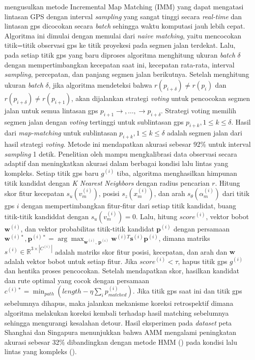 \cite{Huang2022} mengusulkan metode Incremental Map Matching (IMM) yang dapat mengatasi lintasan GPS dengan interval \textit{sampling} yang sangat tinggi secara \textit{real-time} dan lintasan gps dicocokan secara \textit{batch} sehingga waktu komputasi jauh lebih cepat. Algoritma ini dimulai dengan memulai dari \textit{naive matching}, yaitu mencocokan titik=titik observasi gps ke titik proyekesi pada segmen jalan terdekat. Lalu, pada setiap titik gps yang baru diproses algoritma menghitung ukuran \textit{batch} $\delta$ dengan mempertimbangkan kecepatan saat ini, kecepatan rata-rata, interval \textit{sampling}, percepatan, dan panjang segmen jalan berikutnya. Setelah menghitung ukuran \textit{batch} $\delta$, jika algoritma mendeteksi bahwa $r(p_{i+\delta}) \neq r(p_i)$ dan $r(p_{i+\delta}) \neq r(p_{i+1})$, akan dijalankan strategi \textit{voting} untuk pencocokan segmen jalan untuk semua lintasan gps $p_{i+1}\rightarrow,\ldots,\rightarrow p_{i+\delta}$. Strategi voting memilih segmen jalan dengan \textit{voting} tertinggi untuk sublintasan gps $p_{i+k}, 1\leq k \leq \delta$. Hasil dari \textit{map-matching} untuk sublintasan $p_{i+k}, 1\leq k \leq \delta$ adalah segmen jalan dari hasil strategi \textit{voting}. Metode ini mendapatkan akurasi sebesar 92\% untuk interval \textit{sampling} 1 detik. Penelitian oleh \cite{Hu2023} mampu mengkalibrasi data observasi secara adaptif dan meningkatkan akurasi dalam berbagai kondisi lalu lintas yang kompleks. Setiap titik gps baru $g^{(i)}$ tiba, algoritma menghasilkan himpunan titik kandidat dengan \textit{K Nearest Neighbors} dengan radius pencarian $r$. Hitung skor fitur kecepatan $s_u(v_m^{(i)})$, posisi $s_z(x_m^{(i)})$, dan arah $s_\theta(\alpha_m^{(i)})$ dari titik gps $i$ dengan mempertimbangkan fitur-fitur dari setiap titik kandidat, buang titik-titik kandiddat dengan $s_u(v_m^{(i)})=0$. Lalu, hitung $score^{(i)}$, vektor bobot $\mathbf{w}^{(i)}$, dan vektor probabilitas titik-titik kandidat $\mathbf{p}^{(i)}$ dengan persamaan $\mathbf{w}^{(i)*},\mathbf{p}^{(i)*}=\arg\max_{\mathbf{w}^{(i)},\, \mathbf{p}^{(i)}} \mathbf{w}^{(i)T} \mathbf{s}^{(i)} \mathbf{p}^{(i)}$, dimana matriks $s^{(i)} \in \mathbb{R}^{3\times |C^{(i)}|}$ adalah matriks skor fitur posisi, kecepatan, dan arah dan $\mathbf{w}$ adalah vektor bobot untuk setiap fitur. Jika $score^{(i)} < \tau$, hapus titik gps $g^{(i)}$ dan hentika proses pencocokan. Setelah mendapatkan skor, hasilkan kandidat dan rute optimal yang cocok dengan persamaan $c^{(i)*}=\min_{path}(length-\eta\sum_i p_{matched}^{(i)})$. Jika titik gps saat ini dan titik gps sebelumnya dihapus, maka jalankan mekanisme koreksi retrospektif dimana algoritma melakukan koreksi kembali terhadap hasil matching sebelumnya sehingga mengurangi kesalahan detour. Hasil eksperimen pada \textit{dataset} peta Shanghai dan Singapura menunjukkan bahwa AMM mengalami peningkatan akurasi sebesar 32\% dibandingkan dengan metode HMM (\cite{Krumm2009}) pada kondisi lalu lintas yang kompleks (\cite{Hu2023}).

